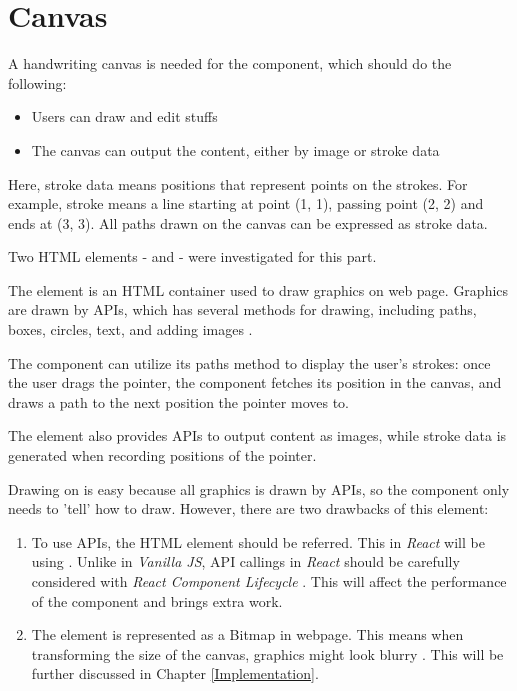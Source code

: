 \documentclass[12pt,twoside]{report}
\begin{document}
\section{Canvas}
\label{bgCanvas}
A handwriting canvas is needed for the component, which should do the following:
\begin{itemize}
    \item Users can draw and edit stuffs
    \item The canvas can output the content, either by image or stroke data
\end{itemize}
Here, stroke data means positions that represent points on the strokes. For
example, stroke  means a line starting at point (1, 1), passing point (2, 2) and ends at (3, 3). All paths drawn on the canvas can be expressed as stroke data.

Two HTML elements -  and  - were investigated for this part.

The  element is an HTML container used
to draw graphics on web page. Graphics are drawn by APIs, which has several
methods for drawing, including paths, boxes, circles, text, and adding images
\cite{webcanvas}. 

The component can utilize its paths method to display the user's strokes: once the user drags the pointer, the component fetches its position in the canvas, and draws a path to the next position the pointer moves to. 

The  element also provides APIs to output content as images, while stroke data is generated when recording positions of the pointer.

Drawing on  is easy because all graphics is drawn by APIs, so the component only needs to 'tell'  how to draw. However, there are two drawbacks of this element: 
\begin{enumerate}
    \item To use  APIs, the HTML element should be referred. This in \textit{React} will be using . Unlike in \textit{Vanilla JS}, API callings in \textit{React} should be carefully considered with \textit{React Component Lifecycle} \cite{webreactlife}. This will affect the performance of the component and brings extra work.
    \item The  element is represented as a Bitmap in webpage. This means when transforming the size of the canvas, graphics might look blurry \cite{webcanvasvssvg}. This will be further discussed in Chapter \ref{Implementation}.
\end{enumerate}
\end{document}

